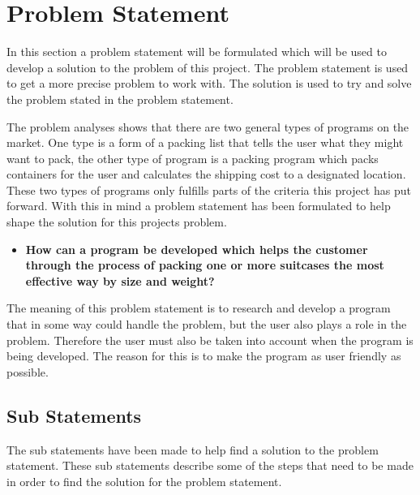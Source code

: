 \section{Problem Statement}
\label{sec:thesis}
In this section a problem statement will be formulated which will be used to develop a solution to the problem of this project. The problem statement is used to get a more precise problem to work with. The solution is used to try and solve the problem stated in the problem statement.

The problem analyses shows that there are two general types of programs on the market. One type is a form of a packing list that tells the user what they might want to pack, the other type of program is a packing program which packs containers for the user and calculates the shipping cost to a designated location. These two types of programs only fulfills parts of the criteria this project has put forward. With this in mind a problem statement has been formulated to help shape the solution for this projects problem.

\begin{itemize}
\item \textbf{How can a program be developed which helps the customer through the process of packing one or more suitcases the most effective way by size and weight?}
\end{itemize}

The meaning of this problem statement is to research and develop a program that in some way could handle the problem, but the user also plays a role in the problem.
Therefore the user must also be taken into account when the program is being developed. The reason for this is to make the program as user friendly as possible.

\subsection{Sub Statements}
The sub statements have been made to help find a solution to the problem statement. These sub statements describe some of the steps that need to be made in order to find the solution for the problem statement.

